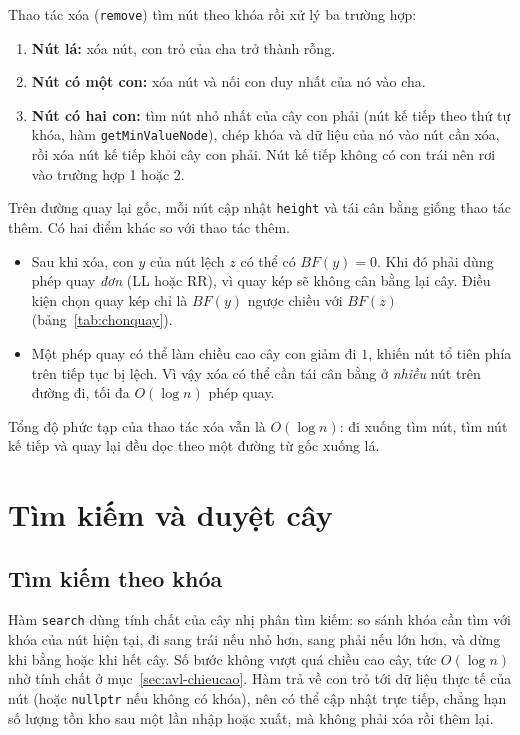 Thao tác xóa (\texttt{remove}) tìm nút theo khóa rồi xử lý ba trường hợp:
\begin{enumerate}
  \item \textbf{Nút lá:} xóa nút, con trỏ của cha trở thành rỗng.
  \item \textbf{Nút có một con:} xóa nút và nối con duy nhất của nó vào cha.
  \item \textbf{Nút có hai con:} tìm nút nhỏ nhất của cây con phải (nút kế tiếp theo
        thứ tự khóa, hàm \texttt{getMinValueNode}), chép khóa và dữ liệu của nó vào
        nút cần xóa, rồi xóa nút kế tiếp khỏi cây con phải. Nút kế tiếp không có
        con trái nên rơi vào trường hợp 1 hoặc 2.
\end{enumerate}
Trên đường quay lại gốc, mỗi nút cập nhật \texttt{height} và tái cân bằng giống
thao tác thêm. Có hai điểm khác so với thao tác thêm.
\begin{itemize}
  \item Sau khi xóa, con $y$ của nút lệch $z$ có thể có $BF(y) = 0$. Khi đó phải
        dùng phép quay \emph{đơn} (LL hoặc RR), vì quay kép sẽ không cân bằng lại
        cây. Điều kiện chọn quay kép chỉ là $BF(y)$ ngược chiều với $BF(z)$
        (bảng~\ref{tab:chonquay}).
  \item Một phép quay có thể làm chiều cao cây con giảm đi $1$, khiến nút tổ tiên
        phía trên tiếp tục bị lệch. Vì vậy xóa có thể cần tái cân bằng ở
        \emph{nhiều} nút trên đường đi, tối đa $O(\log n)$ phép quay.
\end{itemize}
Tổng độ phức tạp của thao tác xóa vẫn là $O(\log n)$: đi xuống tìm nút, tìm nút kế
tiếp và quay lại đều dọc theo một đường từ gốc xuống lá.

\section{Tìm kiếm và duyệt cây}\label{sec:avl-timkiem}

\subsection{Tìm kiếm theo khóa}

Hàm \texttt{search} dùng tính chất của cây nhị phân tìm kiếm: so sánh khóa cần tìm
với khóa của nút hiện tại, đi sang trái nếu nhỏ hơn, sang phải nếu lớn hơn, và
dừng khi bằng hoặc khi hết cây. Số bước không vượt quá chiều cao cây, tức
$O(\log n)$ nhờ tính chất ở mục~\ref{sec:avl-chieucao}. Hàm trả về con trỏ tới
dữ liệu thực tế của nút (hoặc \texttt{nullptr} nếu không có khóa), nên có thể cập
nhật trực tiếp, chẳng hạn số lượng tồn kho sau một lần nhập hoặc xuất, mà không
phải xóa rồi thêm lại.


